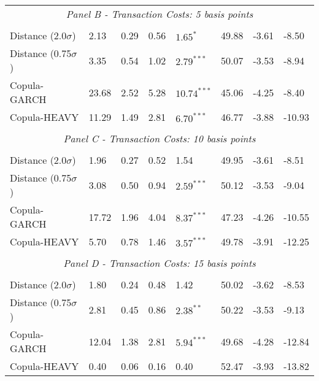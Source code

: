 \documentclass[a4paper,12pt]{report}
\begin{document}
\begin{threeparttable}[H]
\begin{tabularx}{\textwidth}{@{\extracolsep{\fill}}llllllll@{}}
		\multicolumn{8}{c}{\textit{Panel B - Transaction Costs: 5 basis points}} \\
		&       &       &       &       &       &       &  \\
		Distance (2.0$\sigma$) & 2.13  & 0.29  & 0.56  & $1.65^{*}$  & 49.88 & -3.61  & -8.50 \\
		Distance (0.75$\sigma$) & 3.35  & 0.54  & 1.02  & $2.79^{***}$  & 50.07 & -3.53  & -8.94 \\
		Copula-GARCH & 23.68 & 2.52  & 5.28  & $10.74^{***}$ & 45.06 & -4.25  & -8.40 \\
		Copula-HEAVY & 11.29 & 1.49  & 2.81  & $6.70^{***}$  & 46.77 & -3.88  & -10.93 \\
		\multicolumn{1}{r}{} & \multicolumn{1}{r}{} & \multicolumn{1}{r}{} & \multicolumn{1}{r}{} & \multicolumn{1}{r}{} & \multicolumn{1}{r}{} & \multicolumn{1}{r}{} & \multicolumn{1}{r}{} \\
		\multicolumn{8}{c}{\textit{Panel C - Transaction Costs: 10 basis points}} \\
		&       &       &       &       &       &       &  \\
		Distance (2.0$\sigma$) & 1.96  & 0.27  & 0.52  & 1.54  & 49.95 & -3.61  & -8.51 \\
		Distance (0.75$\sigma$) & 3.08  & 0.50  & 0.94  & $2.59^{***}$  & 50.12 & -3.53  & -9.04 \\
		Copula-GARCH & 17.72 & 1.96  & 4.04  & $8.37^{***}$  & 47.23 & -4.26  & -10.55 \\
		Copula-HEAVY & 5.70  & 0.78  & 1.46  & $3.57^{***}$  & 49.78 & -3.91  & -12.25 \\
		\multicolumn{1}{r}{} & \multicolumn{1}{r}{} & \multicolumn{1}{r}{} & \multicolumn{1}{r}{} & \multicolumn{1}{r}{} & \multicolumn{1}{r}{} & \multicolumn{1}{r}{} & \multicolumn{1}{r}{} \\
		\multicolumn{8}{c}{\textit{Panel D - Transaction Costs: 15 basis points}} \\
		&       &       &       &       &       &       &  \\
		Distance (2.0$\sigma$) & 1.80  & 0.24  & 0.48  & 1.42  & 50.02 & -3.62  & -8.53 \\
		Distance (0.75$\sigma$) & 2.81  & 0.45  & 0.86  & $2.38^{**}$  & 50.22 & -3.53  & -9.13 \\
		Copula-GARCH & 12.04 & 1.38  & 2.81  & $5.94^{***}$  & 49.68 & -4.28  & -12.84 \\
		Copula-HEAVY & 0.40  & 0.06  & 0.16  & 0.40  & 52.47 & -3.93  & -13.82 \\

\end{tabularx}
\end{threeparttable}
\end{document}
